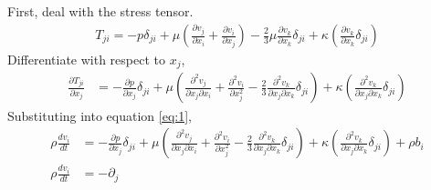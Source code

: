 \subsection{}
First, deal with the stress tensor.
\begin{align*}
    T_{ji} = -p \delta_{ji} + \mu \left(\frac{\partial v_j}{\partial x_i} +
    \frac{\partial v_i}{\partial x_j} \right) - \frac{2}{3} \mu
    \frac{\partial v_k}{\partial x_k} \delta_{ji} + \kappa \left(
    \frac{\partial v_k}{\partial x_k} \delta_{ji} \right)
\end{align*}
Differentiate with respect to $x_j$,
\begin{align*}
    \frac{\partial T_{ji}}{\partial x_j} &= -\frac{\partial p}{\partial x_j} \delta_{ji}
    + \mu \left(\frac{\partial^2 v_j}{\partial x_j \partial x_i} + 
    \frac{\partial^2 v_i}{\partial x_j^2} - 
    \frac{2}{3} \frac{\partial^2 v_k}{\partial x_j \partial x_k} \delta_{ji}\right) + 
    \kappa \left(\frac{\partial^2 v_k}{\partial x_j \partial x_k} \delta_{ji} \right)  
\end{align*}
Substituting into equation \ref{eq:1},
\begin{align*}
    \rho \frac{dv_i}{dt} &= -\frac{\partial p}{\partial x_j} \delta_{ji}
    + \mu \left(\frac{\partial^2 v_j}{\partial x_j \partial x_i} + 
    \frac{\partial^2 v_i}{\partial x_j^2} - 
    \frac{2}{3} \frac{\partial^2 v_k}{\partial x_j \partial x_k} \delta_{ji}\right) + 
    \kappa \left(\frac{\partial^2 v_k}{\partial x_j \partial x_k} \delta_{ji} \right) + \rho b_i \\
    \rho \frac{dv_i}{dt} &= -\partial_{j}
\end{align*}


